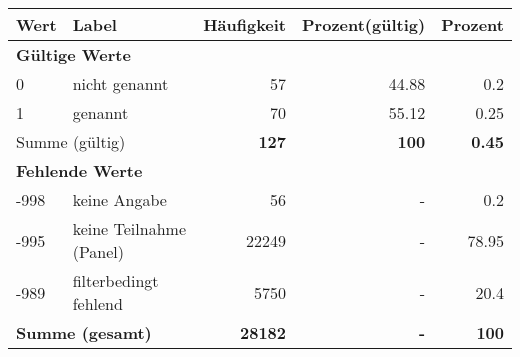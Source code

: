      \begin{longtable}{lXrrr}
     \toprule
     \textbf{Wert} & \textbf{Label} & \textbf{Häufigkeit} & \textbf{Prozent(gültig)} & \textbf{Prozent} \\
     \endhead
     \midrule
     \multicolumn{5}{l}{\textbf{Gültige Werte}}\\

     0 &
     \multicolumn{1}{X}{ nicht genannt   } &


       \num{57} &
       \num[round-mode=places,round-precision=2]{44,88} &
         \num[round-mode=places,round-precision=2]{0,2} \\

     1 &
     \multicolumn{1}{X}{ genannt   } &


       \num{70} &
       \num[round-mode=places,round-precision=2]{55,12} &
         \num[round-mode=places,round-precision=2]{0,25} \\
     \midrule
     \multicolumn{2}{l}{Summe (gültig)} &
       \textbf{\num{127}} &
     \textbf{100} &
       \textbf{\num[round-mode=places,round-precision=2]{0,45}} \\
     \multicolumn{5}{l}{\textbf{Fehlende Werte}}\\
       -998 &
       keine Angabe &
         \num{56} &
        - &
         \num[round-mode=places,round-precision=2]{0,2} \\
       -995 &
       keine Teilnahme (Panel) &
         \num{22249} &
        - &
         \num[round-mode=places,round-precision=2]{78,95} \\
       -989 &
       filterbedingt fehlend &
         \num{5750} &
        - &
         \num[round-mode=places,round-precision=2]{20,4} \\
     \midrule
     \multicolumn{2}{l}{\textbf{Summe (gesamt)}} &
          \textbf{\num{28182}} &
        \textbf{-} &
        \textbf{100} \\
     \bottomrule
     \end{longtable}
     
